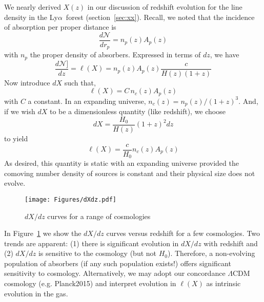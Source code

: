 \documentclass[graybox]{svmult}
\def\lya{Ly$\alpha$}
\begin{document}
We nearly derived $X(z)$ in our discussion of redshift evolution
for the line density in the \lya\ forest (section~\ref{sec:xx}).
Recall, we noted that the 
incidence of absorption per proper distance is
\begin{equation}
\frac{d \mathcal{N}}{dr_p} = n_p(z) A_p(z)
\end{equation}
with $n_p$ the proper density of absorbers.
Expressed in terms of $dz$, we have
\begin{equation}
\frac{d \mathcal{N}]}{dz} = \ell(X) = n_p(z) A_p(z) \frac{c}{H(z) (1+z)}
\end{equation}
Now introduce $dX$ such that,
\begin{equation}
\ell(X) = C \, n_c(z) A_p(z)
\end{equation}
with $C$ a constant.
In an expanding universe, $n_c(z) = n_p(z) / (1+z)^3$.
And, if we wish $dX$ to be a dimensionless quantity (like redshift),
we choose
\begin{equation}
dX = \frac{H_0}{H(z)} (1+z)^2 dz
\end{equation}
to yield
\begin{equation}
\ell(X) = \frac{c}{H_0} n_c(z) A_p(z)
\end{equation}
As desired, this quantity is static with an expanding universe
provided the comoving number density of sources is constant and
their physical size does not evolve.

%
\begin{figure}[b]
\sidecaption
\texttt{[image: Figures/dXdz.pdf]}
%
%
\caption{$dX/dz$ curves for a range of cosmologies
}
\label{fig:dXdz}       %
\end{figure}

In Figure~\ref{fig:dXdz} we show the $dX/dz$ curves versus redshift
for a few cosmologies.  Two trends are apparent:  
(1) there is significant evolution in $dX/dz$ with redshift and
(2) $dX/dz$ is sensitive to the cosmology (but not $H_0$).
Therefore, a non-evolving population of absorbers (if any such
population exists!) offers significant sensitivity to cosmology.
Alternatively, we may adopt our concordance $\Lambda$CDM 
cosmology (e.g. Planck2015) and interpret evolution in
$\ell(X)$ as intrinsic evolution in the gas.
\end{document}

